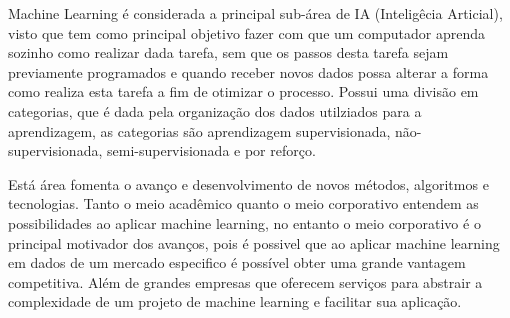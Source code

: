 Machine Learning é considerada a principal sub-área de IA (Inteligêcia Articial), visto que tem como principal objetivo fazer com 
que um computador aprenda sozinho como realizar dada tarefa, sem que os passos desta tarefa sejam previamente programados e
quando receber novos dados possa alterar a forma como realiza esta tarefa a fim de otimizar o processo. Possui uma divisão
em categorias, que é dada pela organização dos dados utilziados para a aprendizagem, as categorias são aprendizagem supervisionada, não-supervisionada, 
semi-supervisionada e por reforço.   


Está área fomenta o avanço e desenvolvimento de novos métodos, algoritmos e tecnologias. Tanto o meio acadêmico quanto o meio 
corporativo entendem as possibilidades ao aplicar machine learning, no entanto o meio corporativo é o principal motivador 
dos avanços, pois é possivel que ao aplicar machine learning em dados de um mercado especifico é possível obter uma grande
vantagem competitiva. Além de grandes empresas que oferecem serviços para abstrair a complexidade de um projeto de 
machine learning e facilitar sua aplicação. 


